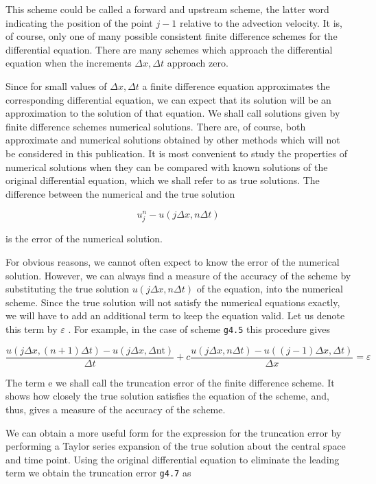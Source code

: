This scheme could be called a forward and upstream scheme, the latter
word indicating the position of the point \(j - 1\) relative to the
advection velocity. It is, of course, only one of many possible
consistent finite difference schemes for the differential equation.
There are many schemes which approach the differential equation when the
increments \(\Delta x,\Delta t\) approach zero.

Since for small values of \(\Delta x,\Delta t\) a finite difference
equation approximates the corresponding differential equation, we can
expect that its solution will be an approximation to the solution of
that equation. We shall call solutions given by finite difference
schemes numerical solutions. There are, of course, both approximate and
numerical solutions obtained by other methods which will not be
considered in this publication. It is most convenient to study the
properties of numerical solutions when they can be compared with known
solutions of the original differential equation, which we shall refer to
as true solutions. The difference between the numerical and the true
solution

    \[u_{j}^{n}-u ( j\Delta x,n\Delta t )\]

is the error of the numerical solution.

For obvious reasons, we cannot often expect to know the error of the
numerical solution. However, we can always find a measure of the
accuracy of the scheme by substituting the true solution
\(u \left( j\Delta x,n\Delta t \right)\) of the equation, into the
numerical scheme. Since the true solution will not satisfy the numerical
equations exactly, we will have to add an additional term to keep the
equation valid. Let us denote this term by \(\varepsilon\) . For
example, in the case of scheme \texttt{g4.5} this procedure gives

    \[\frac{u\left( j\Delta x,( n + 1 )\Delta t \right)
    - u\left( j\Delta x,\Delta\text{nt} \right)}{\Delta t}
+ c\frac{u\left( j\Delta x,n\Delta t \right)
- u\left( \left( j - 1 \right)\Delta x,\Delta t \right)}{\Delta x} = \varepsilon\]

The term e we shall call the truncation error of the finite difference
scheme. It shows how closely the true solution satisfies the equation of
the scheme, and, thus, gives a measure of the accuracy of the scheme.

We can obtain a more useful form for the expression for the truncation
error by performing a Taylor series expansion of the true solution about
the central space and time point. Using the original differential
equation to eliminate the leading term we obtain the truncation error
\texttt{g4.7} as

